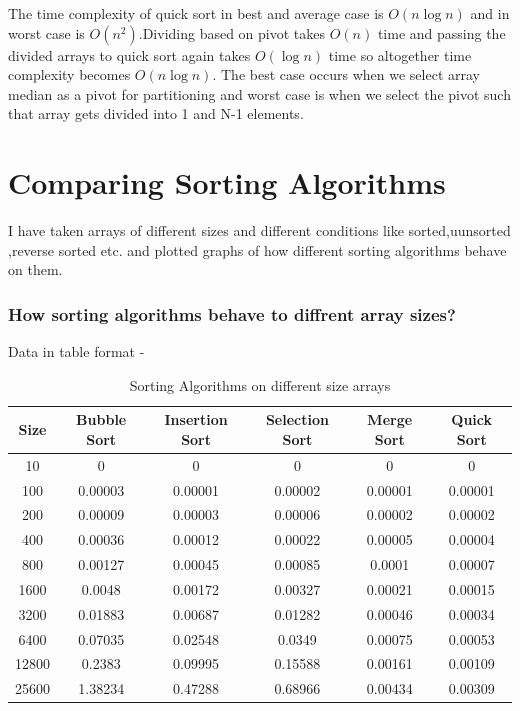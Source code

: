 \documentclass{report}
\begin{document}
The time complexity of quick sort in best and average case is $O(n\log{n})$ and in worst case is $O(n^2)$.Dividing based on pivot takes $O(n)$ time and passing the divided arrays to quick sort again takes $O(\log{n})$ time so altogether time complexity becomes $O(n\log{n})$. The best case occurs when we select array median as a pivot for partitioning and worst case is when we select the pivot such that array gets divided into 1 and N-1 elements. 

\chapter{Comparing Sorting Algorithms}

I have taken arrays of different sizes and different conditions like sorted,uunsorted ,reverse sorted etc. and plotted graphs of how different sorting algorithms behave on them.

\subsection{How sorting algorithms behave to diffrent array sizes?}

Data in table format - 

\begin{table}[H]
\centering
\begin{tabular}{|c|c|c|c|c|c|}
\hline
\textbf{Size} & \textbf{Bubble Sort} & \textbf{Insertion Sort} & \textbf{Selection Sort} & \textbf{Merge Sort} & \textbf{Quick Sort} \\ \hline
10 & 0 & 0 & 0 & 0 & 0 \\ \hline
100 & 0.00003 & 0.00001 & 0.00002 & 0.00001 & 0.00001 \\ \hline
200 & 0.00009 & 0.00003 & 0.00006 & 0.00002 & 0.00002 \\ \hline
400 & 0.00036 & 0.00012 & 0.00022 & 0.00005 & 0.00004 \\ \hline
800 & 0.00127 & 0.00045 & 0.00085 & 0.0001 & 0.00007 \\ \hline
1600 & 0.0048 & 0.00172 & 0.00327 & 0.00021 & 0.00015 \\ \hline
3200 & 0.01883 & 0.00687 & 0.01282 & 0.00046 & 0.00034 \\ \hline
6400 & 0.07035 & 0.02548 & 0.0349 & 0.00075 & 0.00053 \\ \hline
12800 & 0.2383 & 0.09995 & 0.15588 & 0.00161 & 0.00109 \\ \hline
25600 & 1.38234 & 0.47288 & 0.68966 & 0.00434 & 0.00309 \\ \hline
\end{tabular}
\caption{Sorting Algorithms on different size arrays}
\end{table}
\end{document}
